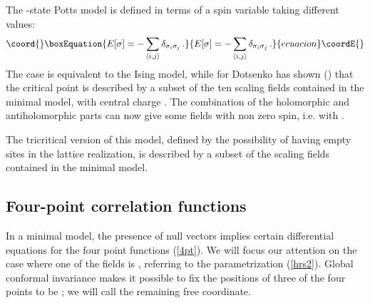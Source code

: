 \documentclass[a4paper,12pt]{report}
\begin{document}
The \coordHE{}-state Potts model is defined in terms of a spin variable \coordHE{} taking \coordHE{} different values:
\begin{equation}\coord{}\boxEquation{\label{potts}
E[\sigma]=-\sum_{\langle i,j\rangle}\delta_{\sigma_{i}\sigma_{j}} \,.
}{E[\sigma]=-\sum_{\langle i,j\rangle}\delta_{\sigma_{i}\sigma_{j}} \,.
}{ecuacion}\coordE{}\end{equation}
The case \coordHE{} is equivalent to the Ising model, while for \coordHE{} Dotsenko has shown (\cite{M65}) that the critical
point is described by a subset of the ten scaling fields contained in the \coordHE{} minimal model, with
central charge \coordHE{}. The combination of the holomorphic and antiholomorphic parts can now give some
fields with non zero spin, i.e. with \coordHE{}.

The tricritical version of this model, defined by the possibility of having empty sites in the lattice
realization, is described by a subset of the scaling fields contained in the \coordHE{} minimal model.

\vspace{0.5cm}

\subsection{Four-point correlation functions}

In a minimal model, the presence of null vectors implies certain differential equations for the four point
functions (\ref{4pt}). We will focus our attention on the case where one of the fields is \coordHE{}, referring
to the parametrization  (\ref{hrs2}). Global conformal invariance makes it possible to fix the positions of three
of the four points to be \coordHE{}; we will call \coordHE{} the remaining free coordinate.
\end{document}
